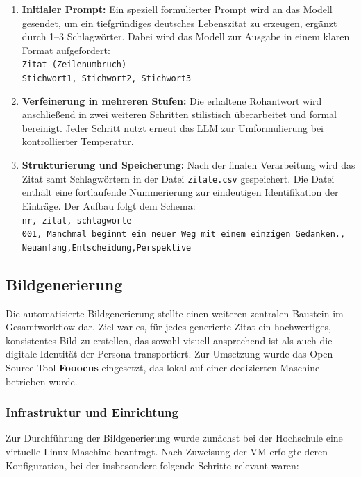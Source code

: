 \documentclass[a4paper,12pt]{article}
\begin{document}
\begin{enumerate}
    \item \textbf{Initialer Prompt:} Ein speziell formulierter Prompt wird an das Modell gesendet, um ein tiefgründiges deutsches Lebenszitat zu erzeugen, ergänzt durch 1–3 Schlagwörter. Dabei wird das Modell zur Ausgabe in einem klaren Format aufgefordert: \\
    \texttt{Zitat (Zeilenumbruch)} \\
    \texttt{Stichwort1, Stichwort2, Stichwort3}

    \item \textbf{Verfeinerung in mehreren Stufen:} Die erhaltene Rohantwort wird anschließend in zwei weiteren Schritten stilistisch überarbeitet und formal bereinigt. Jeder Schritt nutzt erneut das LLM zur Umformulierung bei kontrollierter Temperatur.

    \item \textbf{Strukturierung und Speicherung:} Nach der finalen Verarbeitung wird das Zitat samt Schlagwörtern in der Datei \texttt{zitate.csv} gespeichert. Die Datei enthält eine fortlaufende Nummerierung zur eindeutigen Identifikation der Einträge. Der Aufbau folgt dem Schema: \\
    \texttt{nr, zitat, schlagworte} \\
    \texttt{001, Manchmal beginnt ein neuer Weg mit einem einzigen Gedanken., Neuanfang,Entscheidung,Perspektive}
\end{enumerate}

\subsection{Bildgenerierung}

Die automatisierte Bildgenerierung stellte einen weiteren zentralen Baustein im Gesamtworkflow dar. Ziel war es, für jedes generierte Zitat ein hochwertiges, konsistentes Bild zu erstellen, das sowohl visuell ansprechend ist als auch die digitale Identität der Persona transportiert. Zur Umsetzung wurde das Open-Source-Tool \textbf{Fooocus} eingesetzt, das lokal auf einer dedizierten Maschine betrieben wurde.

\subsubsection*{Infrastruktur und Einrichtung}

Zur Durchführung der Bildgenerierung wurde zunächst bei der Hochschule eine virtuelle Linux-Maschine beantragt. Nach Zuweisung der VM erfolgte deren Konfiguration, bei der insbesondere folgende Schritte relevant waren:
\end{document}
